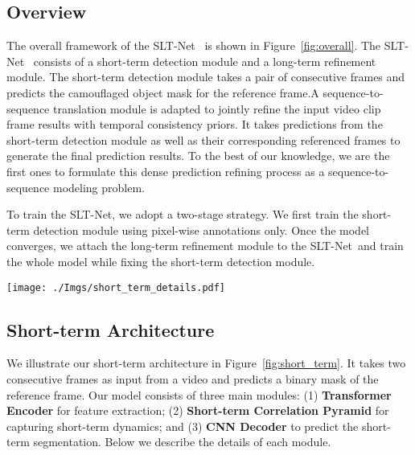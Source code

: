 \documentclass[10pt,twocolumn,letterpaper]{article}
\def\Ourmodel{SLT-Net}
\def\figref#1{Figure~\ref{#1}}
\begin{document}
\subsection{Overview}
The overall framework of the \Ourmodel~ is shown in \figref{fig:overall}. The \Ourmodel~ consists of a short-term detection module and a long-term refinement module. The short-term detection module takes a pair of consecutive frames and predicts the camouflaged object mask for the reference frame.A sequence-to-sequence translation module is adapted to jointly refine the input video clip frame results with temporal consistency priors. It takes  predictions from the short-term detection module as well as their corresponding referenced frames to generate the final prediction results. To the best of our knowledge, we are the first ones to formulate this dense prediction refining process as a sequence-to-sequence modeling problem.

To train the \Ourmodel, we adopt a two-stage strategy. 
We first train the short-term detection module using pixel-wise annotations only. Once the model converges, we attach the long-term refinement module to the \Ourmodel~and train the whole model while fixing the short-term detection module. 

\begin{figure*}[t!]
\begin{center}
\texttt{[image: ./Imgs/short\_term\_details.pdf]}
\end{center}
\vspace{-20pt}
\caption{\small
The overview of our short-term pipeline. The network first extracts features from the input frames by a transformer encoder, then computes a full-range volumetric correspondence between the reference frame  and its neighboring frame  to form a correlation volume pyramid. A  CNN decoder is used to predict the final prediction from the motions captured by the short-term correlation pyramid.}
\vspace{-2mm}
\label{fig:short_term}
\end{figure*}

\subsection{Short-term Architecture}
We illustrate our short-term architecture in \figref{fig:short_term}.
It takes two consecutive frames as input from a video and predicts a binary mask of the reference frame. Our model consists of three main modules: (1) \textbf{Transformer Encoder} for feature extraction; (2) \textbf{Short-term Correlation Pyramid} for capturing short-term dynamics; and (3) \textbf{CNN Decoder} to predict the short-term segmentation. Below we describe the details of each module. 
\end{document}
